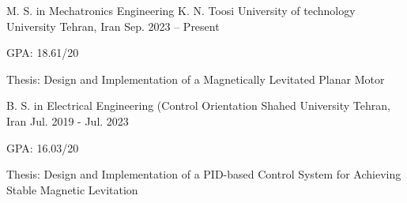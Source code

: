 

\begin{cventries}
  \cventry
{M. S. in Mechatronics Engineering} %
{K. N. Toosi University of technology University} %
{Tehran, Iran} %
{Sep. 2023 -- Present} %
{
	\begin{cvitems} %
		\item {GPA: 18.61/20}
		\item {Thesis: Design and Implementation of a Magnetically Levitated Planar Motor}
	\end{cvitems}
}
  \cventry
    {B. S. in Electrical Engineering (Control Orientation} %
    {Shahed University} %
    {Tehran, Iran} %
    {Jul. 2019 - Jul. 2023} %
    {
      \begin{cvitems} %
        \item {GPA: 16.03/20}
        \item {Thesis: Design and Implementation of a PID-based Control System for Achieving Stable Magnetic Levitation}
      \end{cvitems}
    }

\end{cventries}
